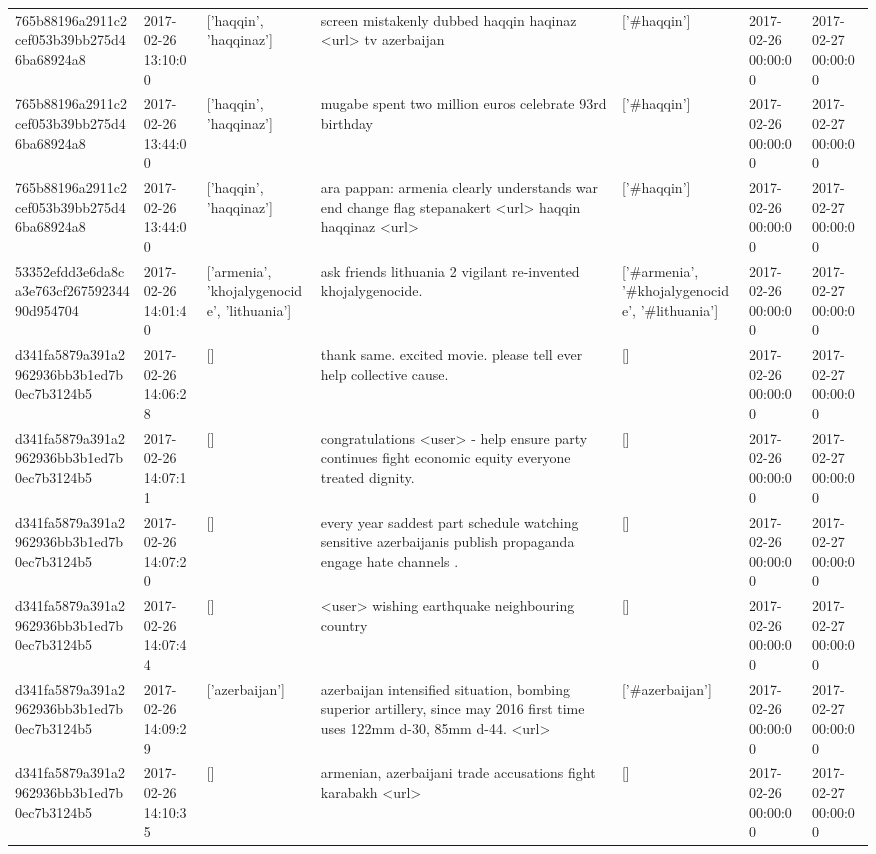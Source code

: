 \begin{tabular}{lllllll}
765b88196a2911c2cef053b39bb275d46ba68924a8 & 2017-02-26 13:10:00 & ['haqqin', 'haqqinaz'] & screen mistakenly dubbed haqqin haqinaz <url> tv azerbaijan & ['#haqqin'] & 2017-02-26 00:00:00 & 2017-02-27 00:00:00 \\
765b88196a2911c2cef053b39bb275d46ba68924a8 & 2017-02-26 13:44:00 & ['haqqin', 'haqqinaz'] & mugabe spent two million euros celebrate 93rd birthday & ['#haqqin'] & 2017-02-26 00:00:00 & 2017-02-27 00:00:00 \\
765b88196a2911c2cef053b39bb275d46ba68924a8 & 2017-02-26 13:44:00 & ['haqqin', 'haqqinaz'] & ara pappan: armenia clearly understands war end change flag stepanakert <url> haqqin haqqinaz <url> & ['#haqqin'] & 2017-02-26 00:00:00 & 2017-02-27 00:00:00 \\
53352efdd3e6da8ca3e763cf26759234490d954704 & 2017-02-26 14:01:40 & ['armenia', 'khojalygenocide', 'lithuania'] & ask friends lithuania 2 vigilant re-invented khojalygenocide. & ['#armenia', '#khojalygenocide', '#lithuania'] & 2017-02-26 00:00:00 & 2017-02-27 00:00:00 \\
d341fa5879a391a2962936bb3b1ed7b0ec7b3124b5 & 2017-02-26 14:06:28 & [] & thank same. excited movie. please tell ever help collective cause. & [] & 2017-02-26 00:00:00 & 2017-02-27 00:00:00 \\
d341fa5879a391a2962936bb3b1ed7b0ec7b3124b5 & 2017-02-26 14:07:11 & [] & congratulations <user> - help ensure party continues fight economic equity everyone treated dignity. & [] & 2017-02-26 00:00:00 & 2017-02-27 00:00:00 \\
d341fa5879a391a2962936bb3b1ed7b0ec7b3124b5 & 2017-02-26 14:07:20 & [] & every year saddest part schedule watching sensitive azerbaijanis publish propaganda engage hate channels . & [] & 2017-02-26 00:00:00 & 2017-02-27 00:00:00 \\
d341fa5879a391a2962936bb3b1ed7b0ec7b3124b5 & 2017-02-26 14:07:44 & [] & <user> wishing earthquake neighbouring country & [] & 2017-02-26 00:00:00 & 2017-02-27 00:00:00 \\
d341fa5879a391a2962936bb3b1ed7b0ec7b3124b5 & 2017-02-26 14:09:29 & ['azerbaijan'] & azerbaijan intensified situation, bombing superior artillery, since may 2016 first time uses 122mm d-30, 85mm d-44. <url> & ['#azerbaijan'] & 2017-02-26 00:00:00 & 2017-02-27 00:00:00 \\
d341fa5879a391a2962936bb3b1ed7b0ec7b3124b5 & 2017-02-26 14:10:35 & [] & armenian, azerbaijani trade accusations fight karabakh <url> & [] & 2017-02-26 00:00:00 & 2017-02-27 00:00:00 \\

\end{tabular}
